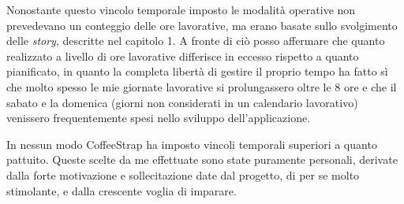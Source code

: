 Nonostante questo vincolo temporale imposto le modalità operative non prevedevano un conteggio delle ore lavorative, ma erano basate sullo svolgimento delle \textit{story}, descritte nel capitolo 1. A fronte di ciò posso affermare che quanto realizzato a livello di ore lavorative differisce in eccesso rispetto a quanto pianificato, in quanto la completa libertà di gestire il proprio tempo ha fatto sì che molto spesso le mie giornate lavorative si prolungassero oltre le 8 ore e che il sabato e la domenica (giorni non considerati in un calendario lavorativo) venissero frequentemente spesi nello sviluppo dell'applicazione.

In nessun modo CoffeeStrap ha imposto vincoli temporali superiori a quanto pattuito. Queste scelte da me effettuate sono state puramente personali, derivate dalla forte motivazione e sollecitazione date dal progetto, di per se molto stimolante, e dalla crescente voglia di imparare.

